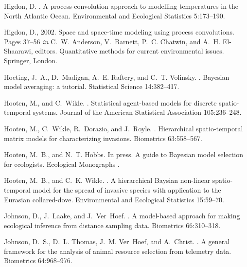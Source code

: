 \documentclass[12pt,english]{article}
\begin{document}
\begin{spacing}{1.9}
\begin{thebibliography}{59}
Higdon, D.
.
\newblock A process-convolution approach to modelling temperatures in the
  {N}orth {A}tlantic {O}cean.
\newblock Environmental and Ecological Statistics { 5}:173--190.

Higdon, D., 2002.
\newblock Space and space-time modeling using process convolutions.
\newblock Pages 37--56 {\em in\/} C.~W. Anderson, V.~Barnett, P.~C. Chatwin,
  and A.~H. El-Shaarawi, editors. Quantitative methods for current
  environmental issues. Springer, London.

Hoeting, J.~A., D.~Madigan, A.~E. Raftery, and C.~T. Volinsky.
.
\newblock Bayesian model averaging: a tutorial.
\newblock Statistical Science { 14}:382--417.

Hooten, M., and C.~Wikle.
.
\newblock Statistical agent-based models for discrete spatio-temporal systems.
\newblock Journal of the American Statistical Association { 105}:236--248.

Hooten, M., C.~Wikle, R.~Dorazio, and J.~Royle.
.
\newblock Hierarchical spatio-temporal matrix models for characterizing
  invasions.
\newblock Biometrics { 63}:558--567.

Hooten, M.~B., and N.~T. Hobbs.
\newblock In press.
\newblock A guide to {B}ayesian model selection for ecologists.
\newblock Ecological Monographs .

Hooten, M.~B., and C.~K. Wikle.
.
\newblock A hierarchical {B}aysian non-linear spatio-temporal model for the
  spread of invasive species with application to the {E}urasian collared-dove.
\newblock Environmental and Ecological Statistics { 15}:59--70.

Johnson, D., J.~Laake, and J.~Ver~Hoef.
.
\newblock A model-based approach for making ecological inference from distance
  sampling data.
\newblock Biometrics { 66}:310--318.

Johnson, D.~S., D.~L. Thomas, J.~M. Ver~Hoef, and A.~Christ.
.
\newblock A general framework for the analysis of animal resource selection
  from telemetry data.
\newblock Biometrics { 64}:968--976.


\end{thebibliography}
\end{spacing}
\end{document}
